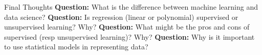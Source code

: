 \documentclass[12pt,t]{beamer}
\begin{document}
\begin{frame}{Final Thoughts}
\textbf{Question:} What is the difference between machine learning and data science?
\vskip0.2cm
\textbf{Question:} Is regression (linear or polynomial) supervised or unsupervised learning? Why?
\vskip0.2cm
\textbf{Question:} What might be the pros and cons of supervised (resp unsupervised learning)? Why?
\vskip0.2cm
\textbf{Question:} Why is it important to use statistical models in representing data?
\end{frame}
\end{document}
